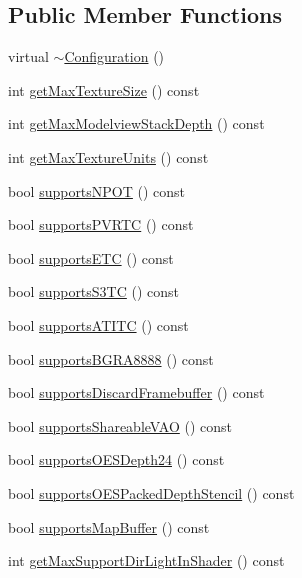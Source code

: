\subsection*{Public Member Functions}
\begin{DoxyCompactItemize}
\item 
virtual \hyperlink{classConfiguration_a0dd0fa189e239f4c9a036303f641441e}{$\sim$\+Configuration} ()
\item 
int \hyperlink{classConfiguration_ab57f9e083afc5471f8af07f7d202135b}{get\+Max\+Texture\+Size} () const
\item 
int \hyperlink{classConfiguration_a0d3b6fb664b2b48b5090f113a34bfd11}{get\+Max\+Modelview\+Stack\+Depth} () const
\item 
int \hyperlink{classConfiguration_ab6b3b10e44ce28029bb9c157a339a91f}{get\+Max\+Texture\+Units} () const
\item 
bool \hyperlink{classConfiguration_a48e53be56a6224f95193a36cd1a5e676}{supports\+N\+P\+OT} () const
\item 
bool \hyperlink{classConfiguration_a58248f2265a92b786058241241cbef1d}{supports\+P\+V\+R\+TC} () const
\item 
bool \hyperlink{classConfiguration_aeb2edb07e4e99adcc5cac8eb40dd5bd1}{supports\+E\+TC} () const
\item 
bool \hyperlink{classConfiguration_af641ae5267113baf708ece702a209b3c}{supports\+S3\+TC} () const
\item 
bool \hyperlink{classConfiguration_a2db018db47cee9e1794138cd8ebf1c40}{supports\+A\+T\+I\+TC} () const
\item 
bool \hyperlink{classConfiguration_a7a86b970a922722012ad50be92e1046f}{supports\+B\+G\+R\+A8888} () const
\item 
bool \hyperlink{classConfiguration_aefcc23eeb53ca5d1fa1115f370c46fe9}{supports\+Discard\+Framebuffer} () const
\item 
bool \hyperlink{classConfiguration_acbd9837dcbd01d0e4994dd361b3e7671}{supports\+Shareable\+V\+AO} () const
\item 
bool \hyperlink{classConfiguration_a4a522f90b542f8aae0cfcfbfbb9c6ee5}{supports\+O\+E\+S\+Depth24} () const
\item 
bool \hyperlink{classConfiguration_a8198d85a51e8b33a9171b0087112038d}{supports\+O\+E\+S\+Packed\+Depth\+Stencil} () const
\item 
bool \hyperlink{classConfiguration_a765fca7763cf48f4ebc8947e2800aa10}{supports\+Map\+Buffer} () const
\item 
int \hyperlink{classConfiguration_a4ab4373afd4bca790279ef1c907b17cb}{get\+Max\+Support\+Dir\+Light\+In\+Shader} () const

\end{DoxyCompactItemize}
